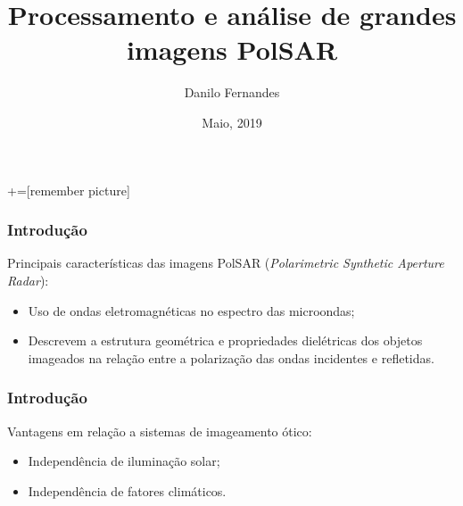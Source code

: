 \documentclass{beamer} %
\author{Danilo Fernandes}
\title{Processamento e análise de grandes imagens PolSAR}
\date{Maio, 2019}
\begin{document}
+=[remember picture]

\everymath{\displaystyle}

\begin{frame}
    \titlepage
\end{frame}

\begin{frame}
\frametitle{Introdução}

Principais características das imagens PolSAR (\textit{Polarimetric Synthetic Aperture Radar}):
\begin{itemize}
    \item Uso de ondas eletromagnéticas no espectro das microondas;%
    \item Descrevem a estrutura geométrica e propriedades dielétricas dos objetos imageados na relação entre a polarização das ondas incidentes e refletidas.
\end{itemize}

\end{frame}

\begin{frame}
\frametitle{Introdução}

Vantagens em relação a sistemas de imageamento ótico:

\begin{itemize}
    \item Independência de iluminação solar;
    \item Independência de fatores climáticos.
\end{itemize}

\end{frame}
\end{document}
